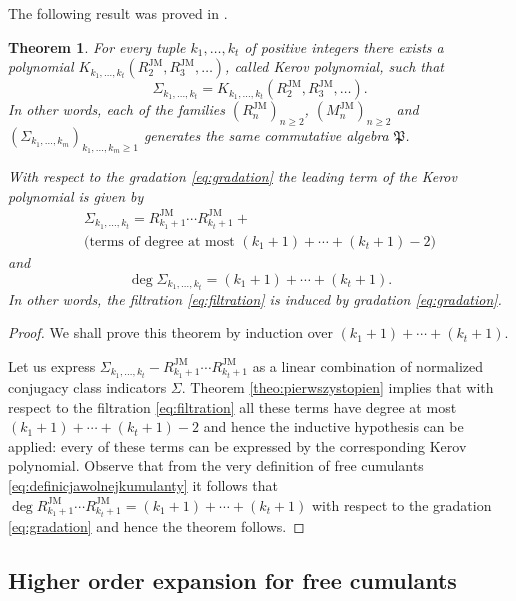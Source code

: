 \documentclass[12pt,dvips]{amsart}
\numberwithin{equation}{section} \numberwithin{figure}{section}
\theoremstyle{plain}
\newtheorem{theorem}[lemma]{Theorem}
\theoremstyle{definition}
\theoremstyle{remark}
\newcommand{\MJM}{M^{\JM}}
\newcommand{\RJM}{R^{\JM}}
\newcommand{\myalgebra}{\mathfrak{P}}
\DeclareMathOperator{\JM}{JM}
\begin{document}
The following result was proved in
\cite{Biane1998,IvanovOlshanski2002}.
\begin{theorem}
\label{theo:kontrolastopnia} For every tuple $k_1,\dots,k_t$ of
positive integers there exists a polynomial
$K_{k_1,\dots,k_t}(\RJM_2,\RJM_3,\dots)$, called  Kerov polynomial, such that
$$ \Sigma_{k_1,\dots,k_t}=K_{k_1,\dots,k_t}(\RJM_2,\RJM_3,\dots). $$
In other words, each of the families $(\RJM_n)_{n\geq 2}$,
$(\MJM_n)_{n\geq 2}$ and
$(\Sigma_{k_1,\dots,k_m})_{k_1,\dots,k_m\geq 1}$ generates the same
commutative algebra $\myalgebra$.

With respect to the gradation \eqref{eq:gradation} the leading term
of the Kerov polynomial is given by
\begin{multline}
\label{eq:eksplozjamozgu}
\Sigma_{k_1,\dots,k_t}=\RJM_{k_1+1} \cdots \RJM_{k_t+1} +\\
\text{(terms of degree at most $(k_1+1)+\cdots+(k_t+1)-2$)}
\end{multline}
and
$$\deg \Sigma_{k_1,\dots,k_t}=(k_1+1)+\cdots+(k_t+1).$$
In other words, the filtration \eqref{eq:filtration} is induced by
gradation \eqref{eq:gradation}.
\end{theorem}
\begin{proof}
We shall prove this theorem by induction over
$(k_1+1)+\cdots+(k_t+1)$.


Let us express $\Sigma_{k_1,\dots,k_t}-\RJM_{k_1+1} \cdots
\RJM_{k_t+1}$ as a linear combination of normalized conjugacy class
indicators $\Sigma$. Theorem \ref{theo:pierwszystopien} implies that
with respect to the filtration \eqref{eq:filtration} all these terms
have degree at most $(k_1+1)+\cdots+(k_t+1)-2$ and hence the
inductive hypothesis can be applied: every of these terms can be
expressed by the corresponding Kerov polynomial. Observe that from
the very definition of free cumulants
\eqref{eq:definicjawolnejkumulanty} it follows that $\deg
\RJM_{k_1+1} \cdots \RJM_{k_t+1}=(k_1+1)+\cdots+(k_t+1)$ with
respect to the gradation \eqref{eq:gradation} and hence the theorem
follows.
\end{proof}





\subsection{Higher order expansion for free cumulants}
\label{sec:evercrossing}
\end{document}
